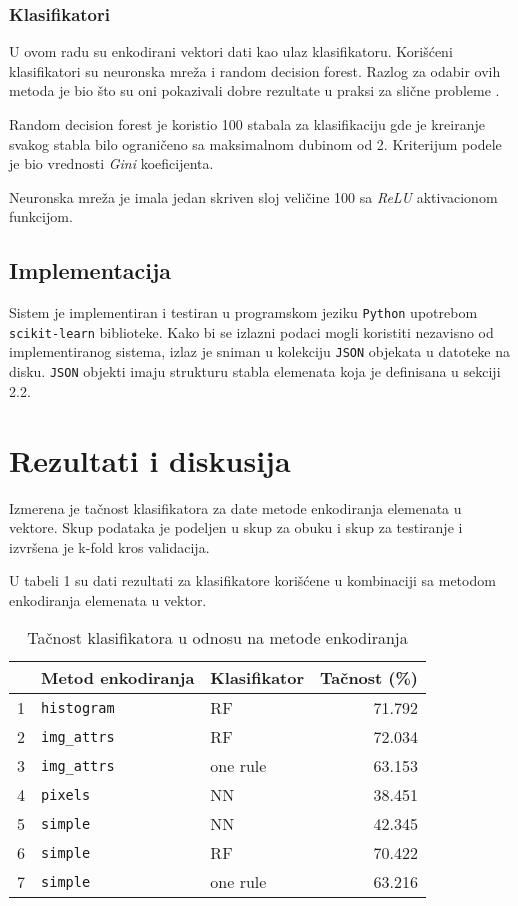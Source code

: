 \documentclass[]{amsart}
\begin{document}
\subsubsection{Klasifikatori}
\label{sec:org0ef63da}

U ovom radu su enkodirani vektori dati kao ulaz klasifikatoru. Korišćeni klasifikatori su neuronska mreža i random decision forest. Razlog za
odabir ovih metoda je bio što su oni pokazivali dobre rezultate u praksi za slične probleme \cite{bitew2018logical} \cite{he2017extracting}.

Random decision forest je koristio 100 stabala za klasifikaciju gde je kreiranje svakog stabla bilo ograničeno sa maksimalnom dubinom od 2. Kriterijum podele je bio vrednosti \textit{Gini} koeficijenta. 

Neuronska mreža je imala jedan skriven sloj veličine 100 sa \textit{ReLU} aktivacionom funkcijom. 

\subsection{Implementacija}
\label{sec:orgf94d64a}

Sistem je implementiran i testiran u programskom jeziku \texttt{Python} upotrebom \texttt{scikit-learn} biblioteke. Kako bi se izlazni podaci mogli koristiti nezavisno od
implementiranog sistema, izlaz je sniman u kolekciju \texttt{JSON} objekata u datoteke na disku. \texttt{JSON} objekti imaju strukturu stabla elemenata koja je definisana u
sekciji 2.2.

\section{Rezultati i diskusija}
\label{sec:orga78d38e}


Izmerena je tačnost klasifikatora za date metode enkodiranja elemenata u vektore. Skup podataka je podeljen u skup za obuku i skup za testiranje
i izvršena je k-fold kros validacija. 

U tabeli 1 su dati rezultati za klasifikatore korišćene u kombinaciji sa metodom enkodiranja elemenata u vektor.


\begin{table}
\begin{tabular}{rllr}
 & Metod enkodiranja & Klasifikator & Tačnost (\%)\\
\hline
1 & \texttt{histogram} & RF & 71.792\\
2 & \texttt{img\_attrs} & RF & 72.034\\
3 & \texttt{img\_attrs} & one rule & 63.153\\
4 & \texttt{pixels} & NN & 38.451\\
5 & \texttt{simple} & NN & 42.345\\
6 & \texttt{simple} & RF & 70.422\\
7 & \texttt{simple} & one rule & 63.216\\
\end{tabular}
\caption{Tačnost klasifikatora u odnosu na metode enkodiranja}
\end{table}
\end{document}
